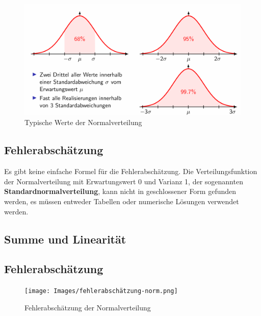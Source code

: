 \documentclass[../Main.tex]{subfiles}
\begin{document}
\begin{figure}[H]
    \centering
    \includegraphics[width=1\linewidth]{Images/norm-typische-werte.png}
    \caption{Typische Werte der Normalverteilung}
\end{figure}

\subsection{Fehlerabschätzung}
Es gibt keine einfache Formel für die Fehlerabschätzung.
Die Verteilungsfunktion der Normalverteilung mit Erwartungswert 0 und Varianz 1,
der sogenannten \textbf{Standardnormalverteilung}, kann nicht in geschlossener Form gefunden werden,
es müssen entweder Tabellen oder numerische  Lösungen verwendet werden.

\subsection{Summe und Linearität}


\subsection{Fehlerabschätzung}

\begin{figure}[H]
    \centering
    \texttt{[image: Images/fehlerabschätzung-norm.png]}
    \caption{Fehlerabschätzung der Normalverteilung}
\end{figure}
\end{document}
